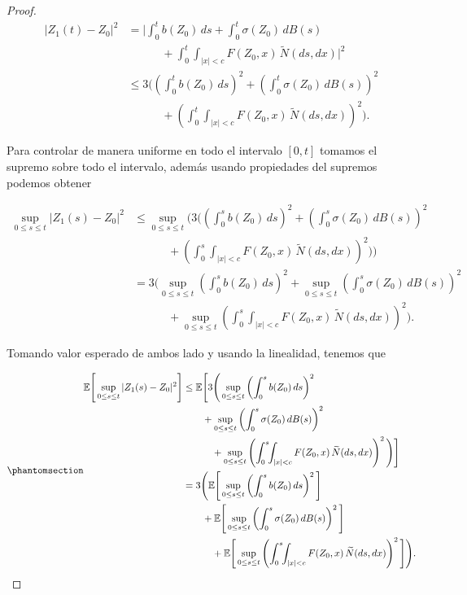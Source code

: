 \documentclass[
  spanish,
  us-letterpaper,
]{scrreprt}
\theoremstyle{plain}
\theoremstyle{plain}
\theoremstyle{plain}
\theoremstyle{definition}
\theoremstyle{remark}
\begin{document}
\begin{proof}
\[
    \begin{aligned}
|Z_1(t)-Z_0|^2
&= \Bigg|
      \int_0^t b(Z_0)\,ds
      + \int_0^t \sigma(Z_0)\,dB(s) \\
&\qquad\quad
      + \int_0^t\!\!\int_{|x|<c} F(Z_0,x)\,\widetilde{N}(ds,dx)
   \Bigg|^2 \\[0.3em]
&\le 3\Bigg(
      \left(\int_0^t b(Z_0)\,ds\right)^2
      + \left(\int_0^t \sigma(Z_0)\,dB(s)\right)^2 \\
&\qquad\quad
      + \left(\int_0^t\!\!\int_{|x|<c} F(Z_0,x)\,\widetilde{N}(ds,dx)\right)^2
   \Bigg).
\end{aligned}
\]

Para controlar de manera uniforme en todo el intervalo \([0,t]\) tomamos
el supremo sobre todo el intervalo, además usando propiedades del
supremos podemos obtener

\[
\begin{aligned}
\sup\limits_{0\leq s\leq t}|Z_1(s)-Z_0|^2
&\leq \sup\limits_{0\leq s\leq t}\Bigg(3\Bigg(
      \left(\int_0^s b(Z_0)\,ds\right)^2
      + \left(\int_0^s \sigma(Z_0)\,dB(s)\right)^2 \\
&\qquad\quad
      + \left(\int_0^s\!\!\int_{|x|<c} F(Z_0,x)\,\widetilde{N}(ds,dx)\right)^2
   \Bigg)\Bigg)\\
& = 3\Bigg(\sup\limits_{0\leq s\leq t}\left(\int_0^s b(Z_0)\,ds\right)^2 + \sup\limits_{0\leq s\leq t} \left(\int_0^s \sigma(Z_0)\,dB(s)\right)^2 \\ 
&\qquad\quad 
    + \sup\limits_{0\leq s\leq t} \left(\int_0^s\!\!\int_{|x|<c} F(Z_0,x)\,\widetilde{N}(ds,dx)\right)^2\Bigg).
\end{aligned}
\]

Tomando valor esperado de ambos lado y usando la linealidad, tenemos que

\begin{equation}\phantomsection\label{eq-5}{
\begin{aligned}
\mathbb{E}\Bigg[\sup\limits_{0\leq s\leq t}|Z_1(s)-Z_0|^2\Bigg]
& \leq \mathbb{E}\Bigg[3\Bigg(\sup\limits_{0\leq s\leq t}\left(\int_0^s b(Z_0)\,ds\right)^2\\
&\qquad   
    + \sup\limits_{0\leq s\leq t} \left(\int_0^s \sigma(Z_0)\,dB(s)\right)^2 \\ 
&\qquad\quad
    + \sup\limits_{0\leq s\leq t} \left(\int_0^s\!\!\int_{|x|<c} F(Z_0,x)\,\widetilde{N}(ds,dx)\right)^2\Bigg)\Bigg]\\
& = 3\Bigg( \mathbb{E}\Bigg[\sup\limits_{0\leq s\leq t}\left(\int_0^s b(Z_0)\,ds\right)^2\Bigg]\\ 
&\qquad
    + \mathbb{E}\Bigg[\sup\limits_{0\leq s\leq t} \left(\int_0^s \sigma(Z_0)\,dB(s)\right)^2\Bigg]\\
&\qquad\quad
    +\mathbb{E}\Bigg[\sup\limits_{0\leq s\leq t} \left(\int_0^s\!\!\int_{|x|<c} F(Z_0,x)\,\widetilde{N}(ds,dx)\right)^2\Bigg]\Bigg).
\end{aligned}
}\end{equation}


\end{proof}
\end{document}

